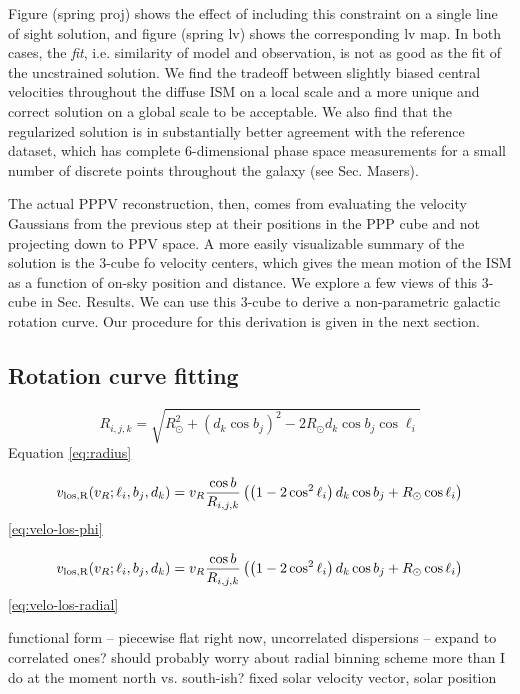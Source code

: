 Figure (spring proj) shows the effect of including this constraint on a single line of sight solution, and figure (spring lv) shows the corresponding lv map. In both cases, the \emph{fit}, i.e. similarity of model and observation, is not as good as the fit of the uncstrained solution. We find the tradeoff between slightly biased central velocities throughout the diffuse ISM on a local scale and a more unique and correct solution on a global scale to be acceptable. We also find that the regularized solution is in substantially better agreement with the reference dataset, which has complete 6-dimensional phase space measurements for a small number of discrete points throughout the galaxy (see Sec. Masers). 

The actual PPPV reconstruction, then, comes from evaluating the velocity Gaussians from the previous step at their positions in the PPP cube and not projecting down to PPV space. A more easily visualizable summary of the solution is the 3-cube fo velocity centers, which gives the mean motion of the ISM as a function of on-sky position and distance. We explore a few views of this 3-cube in Sec. Results. We can use this 3-cube to derive a non-parametric galactic rotation curve. Our procedure for this derivation is given in the next section. 

\subsection{Rotation curve fitting}
\begin{equation}
\label{eq:radius}
    R_{i,j,k} = \sqrt{ R_\odot^2 + (d_k \cos b_j)^2 - 2 R_\odot d_k \cos b_j \cos \ell_i}
\end{equation}
Equation \ref{eq:radius}

\begin{equation}
\label{eq:velo-los-phi}
     v_{\rm{los}, R} (v_R; \ell_i,  b_j, d_k) = v_R \frac{\cos b}{R_{i,j,k}} \left( \left( 1 - 2 \cos^2 \ell_i \right) d_k \cos b_j + R_\odot \cos \ell_i \right)
\end{equation}
\ref{eq:velo-los-phi}

\begin{equation}
\label{eq:velo-los-radial}
    v_{\rm{los}, R} (v_R; \ell_i,  b_j, d_k) = v_R \frac{\cos b}{R_{i,j,k}} \left( \left( 1 - 2 \cos^2 \ell_i \right) d_k \cos b_j + R_\odot \cos \ell_i \right)
\end{equation}
\ref{eq:velo-los-radial}

functional form -- piecewise flat 
right now, uncorrelated dispersions -- expand to correlated ones?
should probably worry about radial binning scheme more than I do at the moment
north vs. south-ish?
fixed solar velocity vector, solar position